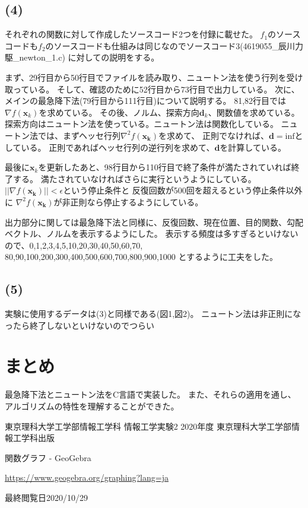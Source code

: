 \documentclass[12pt]{jarticle}
\begin{document}
\clearpage
\subsection*{(4)}
それぞれの関数に対して作成したソースコード2つを付録に載せた。
$f_1$のソースコードも$f_2$のソースコードも仕組みは同じなのでソースコード3(4619055\_辰川力駆\_newton\_1.c)
に対しての説明をする。

まず、29行目から50行目でファイルを読み取り、ニュートン法を使う行列を受け取っている。
そして、確認のために52行目から73行目で出力している。
次に、メインの最急降下法(79行目から111行目)について説明する。
81,82行目では$\nabla f(\boldsymbol{x}_k)$を求めている。
その後、ノルム、探索方向$\boldsymbol{d}_k$、関数値を求めている。
探索方向はニュートン法を使っている。ニュートン法は関数化している。
ニュートン法では、まずヘッセ行列$\nabla^2 f(\boldsymbol{x_k})$を求めて、
正則でなければ、$\boldsymbol{d}=\text{inf}$としている。
正則であればヘッセ行列の逆行列を求めて、$\boldsymbol{d}$を計算している。

最後に$\boldsymbol{x}_k$を更新したあと、98行目から110行目で終了条件が満たされていれば終了する。
満たされていなければさらに実行というようにしている。
$||\nabla f(\boldsymbol{x_k})||<\epsilon$という停止条件と
反復回数が500回を超えるという停止条件以外に
$\nabla^2 f(\boldsymbol{x_k})$が非正則なら停止するようにしている。

出力部分に関しては最急降下法と同様に、反復回数、現在位置、目的関数、勾配ベクトル、ノルムを表示するようにした。
表示する頻度は多すぎるといけないので、0,1,2,3,4,5,10,20,30,40,50,60,70,
80,90,100,200,300,400,500,600,700,800,900,1000
とするように工夫をした。

\subsection*{(5)}
実験に使用するデータは(3)と同様である(図1,図2)。
ニュートン法は非正則になったら終了しないといけないのでつらい

\section{まとめ}
最急降下法とニュートン法をC言語で実装した。
また、それらの適用を通し、
アルゴリズムの特性を理解することができた。

\clearpage

\begin{thebibliography}{99}
    \label{sannkoubunnkenn_chapter}
    東京理科大学工学部情報工学科 情報工学実験2 2020年度
    東京理科大学工学部情報工学科出版

    関数グラフ - GeoGebra

    \url{https://www.geogebra.org/graphing?lang=ja}

    最終閲覧日2020/10/29

\end{thebibliography}
\end{document}
